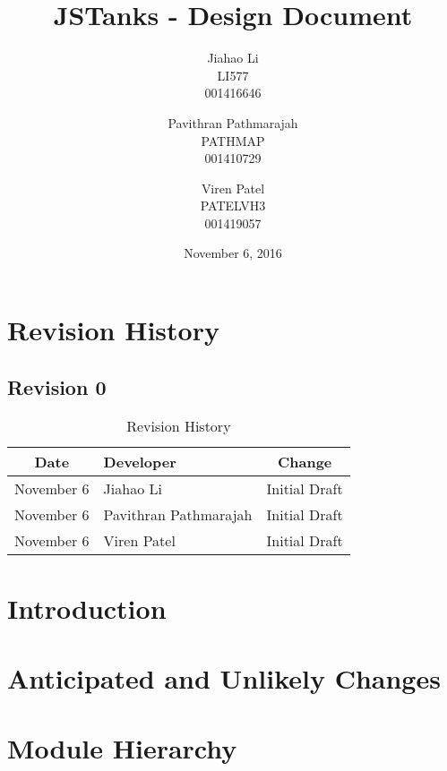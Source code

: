 \documentclass{article}
\begin{document}
\newpage
\title{JSTanks - Design Document}
\date{November 6, 2016}
\author{Jiahao Li\\LI577\\001416646\and Pavithran Pathmarajah\\PATHMAP\\
001410729 \and Viren Patel\\PATELVH3\\001419057}

\maketitle

\newpage
{}
\tableofcontents
\newpage
\listoftables

\newpage
\listoffigures

\newpage
\section{Revision History}
\subsection{Revision 0}
\begin{table}[H]
\caption{Revision History}
	\begin{tabularx}{\textwidth}{cXc}
		\toprule
		Date & Developer & Change\\
		\midrule
		November 6&Jiahao Li &Initial Draft \\
		November 6&Pavithran Pathmarajah &Initial Draft\\
		November 6&Viren Patel  &Initial Draft\\
	\end{tabularx}
\end{table}

\section{Introduction}

\section{Anticipated and Unlikely Changes}

\section{Module Hierarchy}
\end{document}
